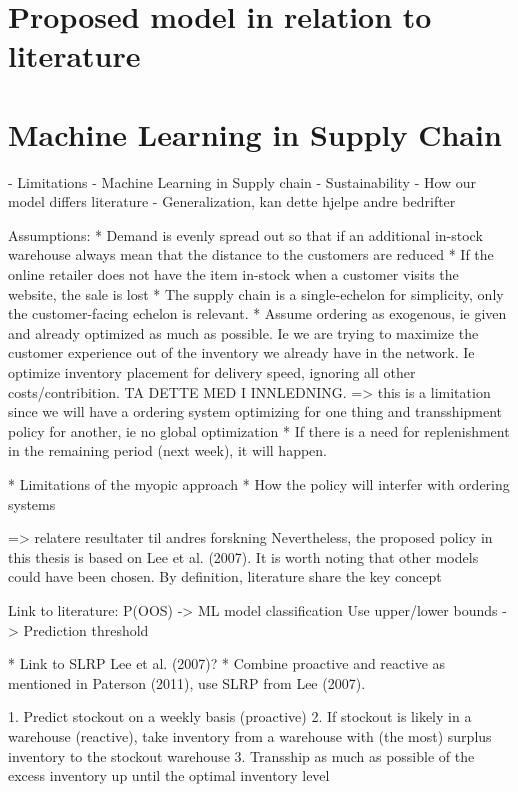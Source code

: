 \documentclass[../../main.tex]{subfiles}
\begin{document}

\section{Proposed model in relation to literature}

\section{Machine Learning in Supply Chain}


- Limitations
- Machine Learning in Supply chain
- Sustainability
- How our model differs literature
- Generalization, kan dette hjelpe andre bedrifter

Assumptions:
* Demand is evenly spread out so that if an additional in-stock warehouse always mean that the distance to the customers are reduced
* If the online retailer does not have the item in-stock when a customer visits the website, the sale is lost
* The supply chain is a single-echelon for simplicity, only the customer-facing echelon is relevant.
* Assume ordering as exogenous, ie given and already optimized as much as possible. Ie we are trying to maximize the customer experience out of the inventory we already have in the network. Ie optimize inventory placement for delivery speed, ignoring all other costs/contribition. TA DETTE MED I INNLEDNING.
=> this is a limitation since we will have a ordering system optimizing for one thing and transshipment policy for another, ie no global optimization
* If there is a need for replenishment in the remaining period (next week), it will happen.

* Limitations of the myopic approach
* How the policy will interfer with ordering systems

=> relatere resultater til andres forskning
Nevertheless, the proposed policy in this thesis is based on Lee et al. (2007). It is worth noting that other models could have been chosen. By definition, literature share the key concept


Link to literature:
P(OOS) -> ML model classification
Use upper/lower bounds -> Prediction threshold


* Link to SLRP Lee et al. (2007)?
  * Combine proactive and reactive as mentioned in Paterson (2011), use SLRP from Lee (2007).

1.	Predict stockout on a weekly basis (proactive)
2.	If stockout is likely in a warehouse (reactive), take inventory from a warehouse with (the most) surplus inventory to the stockout warehouse
3.	Transship as much as possible of the excess inventory up until the optimal inventory level
\end{document}
